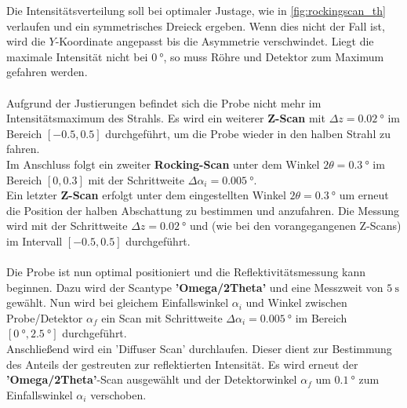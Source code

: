 Die Intensitätsverteilung soll bei optimaler Justage, wie in \autoref{fig:rockingscan_th} verlaufen und ein symmetrisches Dreieck ergeben.
Wenn dies nicht der Fall ist, wird die $Y$-Koordinate angepasst bis die Asymmetrie verschwindet.
Liegt die maximale Intensität nicht bei $\SI{0}{\degree}$, so muss Röhre und Detektor zum Maximum gefahren werden.
\\
\\
Aufgrund der Justierungen befindet sich die Probe nicht mehr im Intensitätsmaximum des Strahls.
Es wird ein weiterer \textbf{Z-Scan} mit $\Delta z = \SI{0.02}{\degree}$ im Bereich $[-0.5, 0.5]$ durchgeführt, um die Probe wieder in den halben Strahl zu fahren.
\\
Im Anschluss folgt ein zweiter \textbf{Rocking-Scan} unter dem Winkel $2 \theta = \SI{0.3}{\degree}$ im Bereich $[0, 0.3]$ mit der Schrittweite $\Delta \alpha_i = \SI{0.005}{\degree}$.
\\
Ein letzter \textbf{Z-Scan} erfolgt unter dem eingestellten Winkel $2 \theta = \SI{0.3}{\degree}$ um erneut die Position der halben Abschattung zu bestimmen und anzufahren.
Die Messung wird mit der Schrittweite $\Delta z = \SI{0.02}{\degree}$ und (wie bei den vorangegangenen Z-Scans) im Intervall $[-0.5, 0.5]$ durchgeführt.
\\
\\
Die Probe ist nun optimal positioniert und die Reflektivitätsmessung kann beginnen.
Dazu wird der Scantype \textbf{'Omega/2Theta'} und eine Messzweit von $\SI{5}{\second}$ gewählt.
Nun wird bei gleichem Einfallswinkel $\alpha_i$ und Winkel zwischen Probe/Detektor $\alpha_f$ ein Scan mit Schrittweite $\Delta \alpha_i = \SI{0.005}{\degree}$ im Bereich $[\SI{0}{\degree}, \SI{2.5}{\degree}]$ durchgeführt.
\\
Anschließend wird ein 'Diffuser Scan' durchlaufen.
Dieser dient zur Bestimmung des Anteils der gestreuten zur reflektierten Intensität.
Es wird erneut der \textbf{'Omega/2Theta'}-Scan ausgewählt und der Detektorwinkel $\alpha_f$ um $\SI{0.1}{\degree}$ zum Einfallswinkel $\alpha_i$ verschoben.